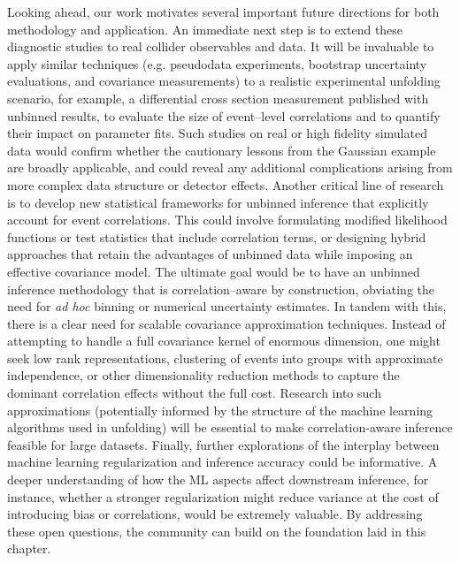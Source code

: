     Looking ahead, our work motivates several important future directions for both methodology and application.
    An immediate next step is to extend these diagnostic studies to real collider observables and data.
    It will be invaluable to apply similar techniques (e.g. pseudodata experiments, bootstrap uncertainty evaluations, and covariance measurements) to a realistic experimental unfolding scenario, for example, a differential cross section measurement published with unbinned results, to evaluate the size of event--level correlations and to quantify their impact on parameter fits.
    Such studies on real or high fidelity simulated data would confirm whether the cautionary lessons from the Gaussian example are broadly applicable, and could reveal any additional complications arising from more complex data structure or detector effects.
    Another critical line of research is to develop new statistical frameworks for unbinned inference that explicitly account for event correlations.
    This could involve formulating modified likelihood functions or test statistics that include correlation terms, or designing hybrid approaches that retain the advantages of unbinned data while imposing an effective covariance model.
    The ultimate goal would be to have an unbinned inference methodology that is correlation--aware by construction, obviating the need for \textit{ad hoc} binning or numerical uncertainty estimates.
    In tandem with this, there is a clear need for scalable covariance approximation techniques.
    Instead of attempting to handle a full covariance kernel of enormous dimension, one might seek low rank representations, clustering of events into groups with approximate independence, or other dimensionality reduction methods to capture the dominant correlation effects without the full cost.
    Research into such approximations (potentially informed by the structure of the machine learning algorithms used in unfolding) will be essential to make correlation-aware inference feasible for large datasets.
    Finally, further explorations of the interplay between machine learning regularization and inference accuracy could be informative.
    A deeper understanding of how the ML aspects affect downstream inference, for instance, whether a stronger regularization might reduce variance at the cost of introducing bias or correlations, would be extremely valuable.
    By addressing these open questions, the community can build on the foundation laid in this chapter.

